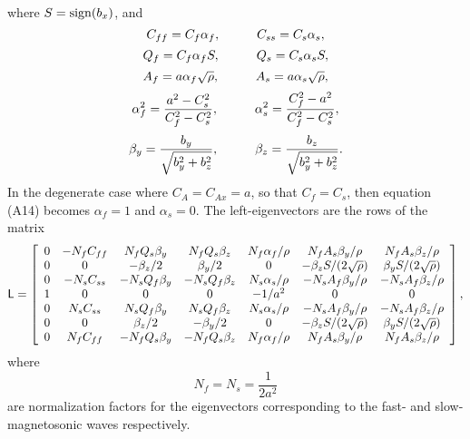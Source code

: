 where $S={\rm sign}(b_{x})$, and
\begin{equation}
C_{ff} = C_{f}\alpha_{f}, \hspace*{1cm}
C_{ss} = C_{s}\alpha_{s},
\end{equation}
\begin{equation}
Q_{f} = C_{f}\alpha_{f}S, \hspace*{1cm}
Q_{s} = C_{s}\alpha_{s}S,
\end{equation}
\begin{equation}
A_{f} = a\alpha_{f}\sqrt{\rho}, \hspace*{1cm}
A_{s} = a\alpha_{s}\sqrt{\rho},
\end{equation}
\begin{equation}
\alpha_{f}^{2} = \frac{a^{2} - C_{s}^{2}}{C_{f}^{2} - C_{s}^{2}}, \hspace*{1cm}
\alpha_{s}^{2} = \frac{C_{f}^{2} - a^{2}}{C_{f}^{2} - C_{s}^{2}},
\end{equation}
\begin{equation}
\beta_{y} = \frac{b_{y}}{\sqrt{b_{y}^{2} + b_{z}^{2}}}, \hspace*{1cm}
\beta_{z} = \frac{b_{z}}{\sqrt{b_{y}^{2} + b_{z}^{2}}}.
\end{equation}
In the degenerate case where $C_{A}=C_{Ax}=a$, so that $C_{f}=C_{s}$, then
equation (A14) becomes $\alpha_{f}=1$ and $\alpha_{s}=0$.
The left-eigenvectors are the rows of the matrix
\begin{equation}
{\sf L}  = \left[ \begin{array}{ccccccc}
0 & -N_{f}C_{ff} & N_{f}Q_{s}\beta_{y} & N_{f}Q_{s}\beta_{z} & N_{f}\alpha_{f}/\rho & N_{f}A_{s}\beta_{y}/\rho & N_{f}A_{s}\beta_{z}/\rho \\
0 & 0 & -\beta_{z}/2 & \beta_{y}/2 & 0 & -\beta_{z}S/(2\sqrt{\rho}) & \beta_{y}S/(2\sqrt{\rho}) \\
0 & -N_{s}C_{ss} & -N_{s}Q_{f}\beta_{y} & -N_{s}Q_{f}\beta_{z} & N_{s}\alpha_{s}/\rho & -N_{s}A_{f}\beta_{y}/\rho & -N_{s}A_{f}\beta_{z}/\rho \\
1 & 0 & 0 & 0 & -1/a^{2} & 0 & 0 \\
0 & N_{s}C_{ss} & N_{s}Q_{f}\beta_{y} & N_{s}Q_{f}\beta_{z} & N_{s}\alpha_{s}/\rho & -N_{s}A_{f}\beta_{y}/\rho & -N_{s}A_{f}\beta_{z}/\rho \\
0 & 0 & \beta_{z}/2 & -\beta_{y}/2 & 0 & -\beta_{z}S/(2\sqrt{\rho}) & \beta_{y}S/(2\sqrt{\rho}) \\
0 & N_{f}C_{ff} & -N_{f}Q_{s}\beta_{y} & -N_{f}Q_{s}\beta_{z} & N_{f}\alpha_{f}/\rho & N_{f}A_{s}\beta_{y}/\rho & N_{f}A_{s}\beta_{z}/\rho \end{array} \right] ,
\end{equation}
where
\begin{equation}
N_{f} = N_{s} = \frac{1}{2a^{2}}
\end{equation}
are normalization factors for the eigenvectors corresponding to the fast-
and slow-magnetosonic waves respectively.

